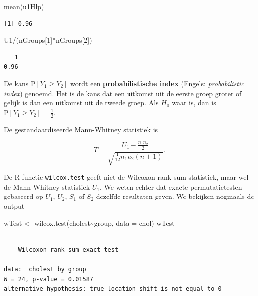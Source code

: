 \documentclass[
  dutch,
  letterpaper,
  12pt]{book}
\newenvironment{Shaded}{\begin{snugshade}}{\end{snugshade}}
\newcommand{\AttributeTok}[1]{\textcolor[rgb]{0.40,0.45,0.13}{#1}}
\newcommand{\DecValTok}[1]{\textcolor[rgb]{0.68,0.00,0.00}{#1}}
\newcommand{\FunctionTok}[1]{\textcolor[rgb]{0.28,0.35,0.67}{#1}}
\newcommand{\NormalTok}[1]{\textcolor[rgb]{0.00,0.23,0.31}{#1}}
\newcommand{\OtherTok}[1]{\textcolor[rgb]{0.00,0.23,0.31}{#1}}
\newcommand{\SpecialCharTok}[1]{\textcolor[rgb]{0.37,0.37,0.37}{#1}}
\theoremstyle{definition}
\theoremstyle{definition}
\theoremstyle{definition}
\theoremstyle{remark}
\begin{document}
\begin{Shaded}
\begin{Highlighting}[]
\FunctionTok{mean}\NormalTok{(u1Hlp)}
\end{Highlighting}
\end{Shaded}

\begin{verbatim}
[1] 0.96
\end{verbatim}

\begin{Shaded}
\begin{Highlighting}[]
\NormalTok{U1}\SpecialCharTok{/}\NormalTok{(nGroups[}\DecValTok{1}\NormalTok{]}\SpecialCharTok{*}\NormalTok{nGroups[}\DecValTok{2}\NormalTok{])}
\end{Highlighting}
\end{Shaded}

\begin{verbatim}
   1 
0.96 
\end{verbatim}

De kans \(\text{P}\left[Y_1 \geq Y_2\right]\) wordt een
\textbf{probabilistische index} (Engels: \emph{probabilistic index})
genoemd. Het is de kans dat een uitkomst uit de eerste groep groter of
gelijk is dan een uitkomst uit de tweede groep. Als \(H_0\) waar is, dan
is \(\text{P}\left[Y_1 \geq Y_2\right]=\frac{1}{2}\).

De gestandaardiseerde Mann-Whitney statistiek is

\[T = \frac{U_1 - \frac{n_1n_2}{2}}{\sqrt{\frac{1}{12}n_1n_2(n+1)}}.\]

De R functie \texttt{wilcox.test} geeft niet de Wilcoxon rank sum
statistiek, maar wel de Mann-Whitney statistiek \(U_1\). We weten echter
dat exacte permutatietesten gebaseerd op \(U_1\), \(U_2\), \(S_1\) of
\(S_2\) dezelfde resultaten geven. We bekijken nogmaals de output

\begin{Shaded}
\begin{Highlighting}[]
\NormalTok{wTest }\OtherTok{\textless{}{-}} \FunctionTok{wilcox.test}\NormalTok{(cholest}\SpecialCharTok{\textasciitilde{}}\NormalTok{group, }\AttributeTok{data =}\NormalTok{ chol)}
\NormalTok{wTest}
\end{Highlighting}
\end{Shaded}

\begin{verbatim}

    Wilcoxon rank sum exact test

data:  cholest by group
W = 24, p-value = 0.01587
alternative hypothesis: true location shift is not equal to 0
\end{verbatim}
\end{document}
